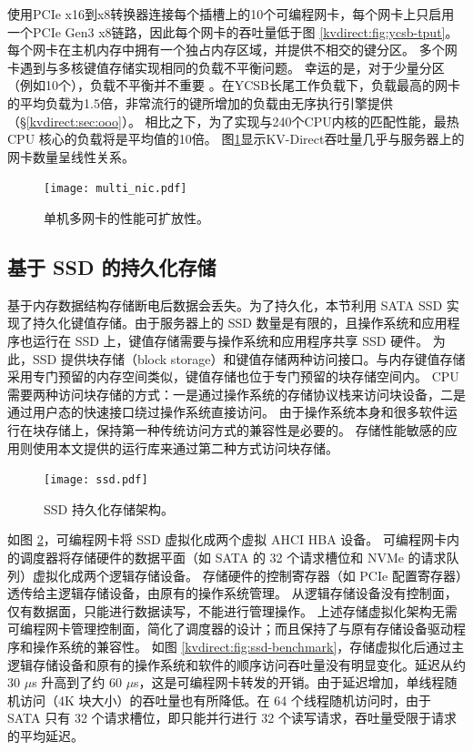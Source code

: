 使用PCIe x16到x8转换器连接每个插槽上的10个可编程网卡，每个网卡上只启用一个PCIe Gen3 x8链路，因此每个网卡的吞吐量低于图 \ref {kvdirect:fig:ycsb-tput}。
每个网卡在主机内存中拥有一个独占内存区域，并提供不相交的键分区。
多个网卡遇到与多核键值存储实现相同的负载不平衡问题。
幸运的是，对于少量分区（例如10个），负载不平衡并不重要 \cite {lim2014mica,li2016full}。在YCSB长尾工作负载下，负载最高的网卡的平均负载为1.5倍，非常流行的键所增加的负载由无序执行引擎提供（\S \ref {kvdirect:sec:ooo}）。
相比之下，为了实现与240个CPU内核的匹配性能，最热 CPU 核心的负载将是平均值的10倍。
图\ref {kvdirect:fig:multiple-nics}显示KV-Direct吞吐量几乎与服务器上的网卡数量呈线性关系。


\begin{figure}[htbp]
	\centering
	\texttt{[image: multi\_nic.pdf]}
	\caption{单机多网卡的性能可扩放性。}
	\label{kvdirect:fig:multiple-nics}
\end{figure}


\subsection{基于 SSD 的持久化存储}
\label{sec:durable-storage}

基于内存数据结构存储断电后数据会丢失。为了持久化，本节利用 SATA SSD 实现了持久化键值存储。由于服务器上的 SSD 数量是有限的，且操作系统和应用程序也运行在 SSD 上，键值存储需要与操作系统和应用程序共享 SSD 硬件。
为此，SSD 提供块存储（block storage）和键值存储两种访问接口。与内存键值存储采用专门预留的内存空间类似，键值存储也位于专门预留的块存储空间内。
CPU 需要两种访问块存储的方式：一是通过操作系统的存储协议栈来访问块设备，二是通过用户态的快速接口绕过操作系统直接访问。
由于操作系统本身和很多软件运行在块存储上，保持第一种传统访问方式的兼容性是必要的。
存储性能敏感的应用则使用本文提供的运行库来通过第二种方式访问块存储。


\begin{figure}[htbp]
	\centering
	\texttt{[image: ssd.pdf]}
	\caption{SSD 持久化存储架构。}
	\label{kvdirect:fig:ssd}
\end{figure}

如图 \ref{kvdirect:fig:ssd}，可编程网卡将 SSD 虚拟化成两个虚拟 AHCI HBA 设备。
可编程网卡内的调度器将存储硬件的数据平面（如 SATA 的 32 个请求槽位和 NVMe 的请求队列）虚拟化成两个逻辑存储设备。
存储硬件的控制寄存器（如 PCIe 配置寄存器）透传给主逻辑存储设备，由原有的操作系统管理。
从逻辑存储设备没有控制面，仅有数据面，只能进行数据读写，不能进行管理操作。
上述存储虚拟化架构无需可编程网卡管理控制面，简化了调度器的设计；而且保持了与原有存储设备驱动程序和操作系统的兼容性。
如图 \ref{kvdirect:fig:ssd-benchmark}，存储虚拟化后通过主逻辑存储设备和原有的操作系统和软件的顺序访问吞吐量没有明显变化。延迟从约 30 $\mu$s 升高到了约 60 $\mu$s，这是可编程网卡转发的开销。由于延迟增加，单线程随机访问（4K 块大小）的吞吐量也有所降低。在 64 个线程随机访问时，由于 SATA 只有 32 个请求槽位，即只能并行进行 32 个读写请求，吞吐量受限于请求的平均延迟。

